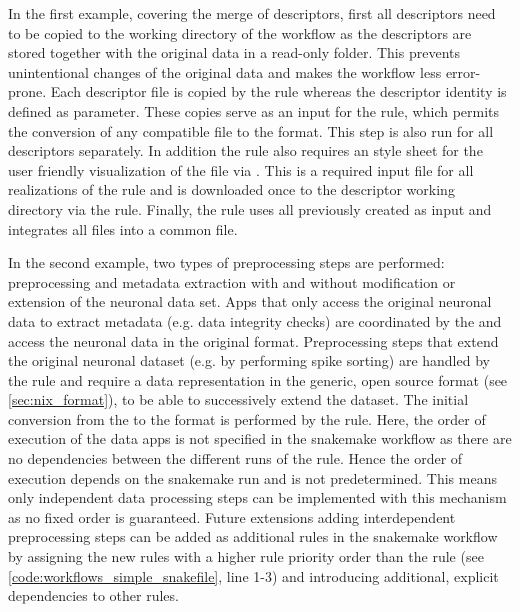 In the first example, covering the merge of descriptors, first all  descriptors need to be copied to the working directory of the workflow as the descriptors are stored together with the original data in a read-only folder. This prevents unintentional changes of the original data and makes the workflow less error-prone. Each descriptor file is copied by the  rule whereas the descriptor identity is defined as parameter. These copies serve as an input for the  rule, which permits the conversion of any  compatible  file to the  format. This step is also run for all descriptors separately. In addition the  rule also requires an  style sheet for the user friendly visualization of the  file via . This is a required input file for all realizations of the  rule and is downloaded once to the descriptor working directory via the  rule. Finally, the  rule uses all previously created  as input and integrates all  files into a common  file.

In the second example, two types of preprocessing steps are performed: preprocessing and metadata extraction with and without modification or extension of the neuronal data set. Apps that only access the original neuronal data to extract metadata (e.g. data integrity checks) are coordinated by the  and access the neuronal data in the original  format. Preprocessing steps that extend the original neuronal dataset (e.g. by performing spike sorting) are handled by the  rule and require a data representation in the generic, open source  format (see \cref{sec:nix_format}), to be able to successively extend the dataset. The initial conversion from the  to the  format is performed by the  rule. Here, the order of execution of the data apps is not specified in the snakemake workflow as there are no dependencies between the different runs of the  rule. Hence the order of execution depends on the snakemake run and is not predetermined. This means only independent data processing steps can be implemented with this mechanism as no fixed order is guaranteed. Future extensions adding interdependent preprocessing steps can be added as additional rules in the snakemake workflow by assigning the new rules with a higher rule priority order than the  rule (see \cref{code:workflows_simple_snakefile}, line 1-3) and introducing additional, explicit dependencies to other rules.

